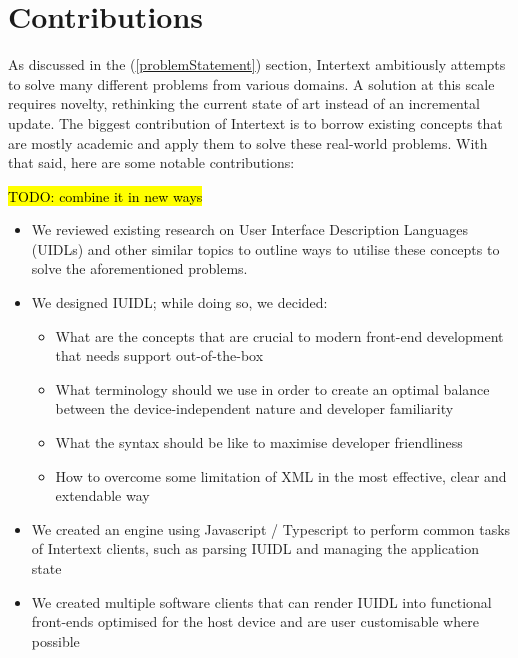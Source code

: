 
\section{Contributions} \label{contributions}

As discussed in the  (\ref{problemStatement}) section, Intertext ambitiously attempts to solve many different problems from various domains. A solution at this scale requires novelty, rethinking the current state of art instead of an incremental update. The biggest contribution of Intertext is to borrow existing concepts that are mostly academic and apply them to solve these real-world problems. With that said, here are some notable contributions:

\hl{TODO: combine it in new ways}

\begin{itemize}
  \item We reviewed existing research on User Interface Description Languages (UIDLs) and other similar topics to outline ways to utilise these concepts to solve the aforementioned problems.
  \item We designed IUIDL; while doing so, we decided:
  \begin{itemize}
    \item What are the concepts that are crucial to modern front-end development that needs support out-of-the-box
    \item What terminology should we use in order to create an optimal balance between the device-independent nature and developer familiarity
    \item What the syntax should be like to maximise developer friendliness
    \item How to overcome some limitation of XML in the most effective, clear and extendable way
  \end{itemize}
  \item We created an engine using Javascript / Typescript to perform common tasks of Intertext clients, such as parsing IUIDL and managing the application state
  \item We created multiple software clients that can render IUIDL into functional front-ends optimised for the host device and are user customisable where possible
\end{itemize}